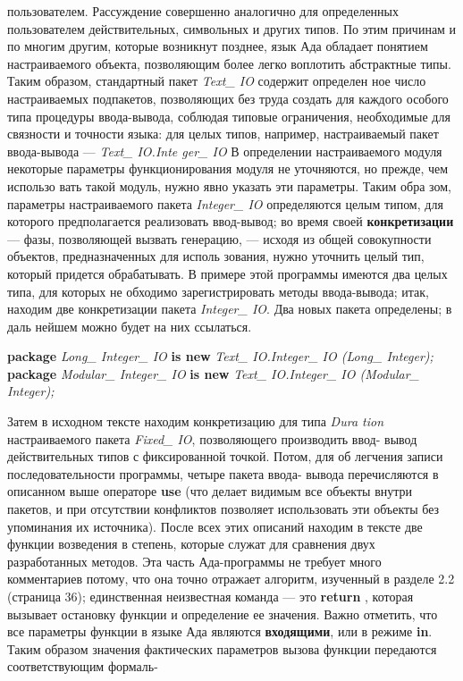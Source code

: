 \newpage

пользователем. Рассуждение совершенно аналогично для определенных
пользователем действительных, символьных и других типов. По этим
причинам и по многим другим, которые возникнут позднее, язык Ада
обладает понятием настраиваемого объекта, позволяющим более легко
воплотить абстрактные типы.
Таким образом, стандартный пакет {\it Text\_ IO} содержит определен­
ное число настраиваемых подпакетов, позволяющих без труда создать
для каждого особого типа процедуры ввода-вывода, соблюдая типовые
ограничения, необходимые для связности и точности языка: для целых
типов, например, настраиваемый пакет ввода-вывода — {\it Text\_ IO.Inte­
ger\_ IO} В определении настраиваемого модуля некоторые параметры
функционирования модуля не уточняются, но прежде, чем использо­
вать такой модуль, нужно явно указать эти параметры. Таким обра­
зом, параметры настраиваемого пакета {\it Integer\_ IO} определяются целым
типом, для которого предполагается реализовать ввод-вывод; во время
своей {\bf конкретизации} — фазы, позволяющей вызвать генерацию, —
исходя из общей совокупности объектов, предназначенных для исполь­
зования, нужно уточнить целый тип, который придется обрабатывать.
В примере этой программы имеются два целых типа, для которых не­
обходимо зарегистрировать методы ввода-вывода; итак, находим две
конкретизации пакета {\it Integer\_ IO}. Два новых пакета определены; в даль­
нейшем можно будет на них ссылаться.
\begin{center}
\parbox{14cm}{
{\bf package} {\it Long\_ Integer\_ IO} {\bf is new} {\it Text\_ IO.Integer\_ IO (Long\_ Integer);}\\
{\bf package} {\it Modular\_ Integer\_ IO} {\bf is new} {\it Text\_ IO.Integer\_ IO (Modular\_ Integer);}}
\end{center}
Затем в исходном тексте находим конкретизацию для типа {\it Dura­
tion} настраиваемого пакета {\it Fixed\_ IO}, позволяющего производить ввод-
вывод действительных типов с фиксированной точкой. Потом, для об­
легчения записи последовательности программы, четыре пакета ввода-
вывода перечисляются в описанном выше операторе {\bf use} (что делает
видимым все объекты внутри пакетов, и при отсутствии конфликтов
позволяет использовать эти объекты без упоминания их источника).
После всех этих описаний находим в тексте две функции возведения
в степень, которые служат для сравнения двух разработанных методов.
Эта часть Ада-программы не требует много комментариев потому, что
она точно отражает алгоритм, изученный в разделе 2.2 (страница 36);
единственная неизвестная команда — это {\bf return} , которая вызывает
остановку функции и определение ее значения.
Важно отметить, что все параметры функции в языке Ада являются
{\bf входящими}, или в режиме {\bf in}. Таким образом значения фактических
параметров вызова функции передаются соответствующим формаль-
\newpage


